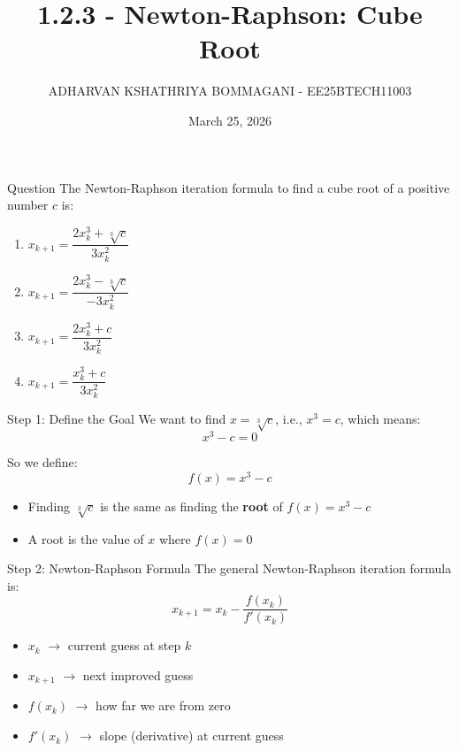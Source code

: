 \documentclass{beamer}
\title{1.2.3 - Newton-Raphson: Cube Root}
\date{March 25, 2026}
\author{ADHARVAN KSHATHRIYA BOMMAGANI - EE25BTECH11003}
\begin{document}
\frame{\titlepage}

\begin{frame}{Question}
The Newton-Raphson iteration formula to find a cube root of a positive number $c$ is:

\begin{enumerate}[label=\alph*)]
    \item $x_{k+1} = \dfrac{2x_k^3 + \sqrt[3]{c}}{3x_k^2}$
    \vspace{0.3cm}
    \item $x_{k+1} = \dfrac{2x_k^3 - \sqrt[3]{c}}{-3x_k^2}$
    \vspace{0.3cm}
    \item $x_{k+1} = \dfrac{2x_k^3 + c}{3x_k^2}$
    \vspace{0.3cm}
    \item $x_{k+1} = \dfrac{x_k^3 + c}{3x_k^2}$
\end{enumerate}
\end{frame}

\begin{frame}{Step 1: Define the Goal}
We want to find $x = \sqrt[3]{c}$, i.e., $x^3 = c$, which means:
\[
x^3 - c = 0
\]

So we define:
\[
f(x) = x^3 - c
\]

\begin{itemize}
    \item Finding $\sqrt[3]{c}$ is the same as finding the \textbf{root} of $f(x) = x^3 - c$
    \item A root is the value of $x$ where $f(x) = 0$
\end{itemize}
\end{frame}

\begin{frame}{Step 2: Newton-Raphson Formula}
The general Newton-Raphson iteration formula is:
\[
x_{k+1} = x_k - \frac{f(x_k)}{f'(x_k)}
\]

\begin{itemize}
    \item $x_k$ $\rightarrow$ current guess at step $k$
    \item $x_{k+1}$ $\rightarrow$ next improved guess
    \item $f(x_k)$ $\rightarrow$ how far we are from zero
    \item $f'(x_k)$ $\rightarrow$ slope (derivative) at current guess
\end{itemize}
\end{frame}
\end{document}
